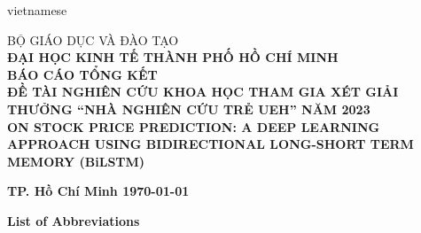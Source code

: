 \documentclass[a4paper]{article}
\begin{document}
\fontsize{13pt}{15pt}\selectfont
\setlength{\parindent}{0cm}
\setlength{\parskip}{1.5ex}
\setlength{\baselineskip}{1.5\baselineskip}
\begin{otherlanguage*}{vietnamese}
\begin{titlepage}

 
\begin{center}

\Large BỘ GIÁO DỤC VÀ ĐÀO TẠO\\[7pt]
\textbf{\Large ĐẠI HỌC KINH TẾ THÀNH PHỐ HỒ CHÍ MINH}\\[3.5cm]
\LARGE\textbf{BÁO CÁO TỔNG KẾT}\\[0.5cm]
\Large\textbf{ĐỀ TÀI NGHIÊN CỨU KHOA HỌC THAM GIA XÉT GIẢI THƯỞNG ``NHÀ NGHIÊN CỨU TRẺ UEH'' NĂM 2023}\\[3cm]

\LARGE\textbf{ON STOCK PRICE PREDICTION: A DEEP LEARNING APPROACH USING BIDIRECTIONAL LONG-SHORT TERM MEMORY (BiLSTM)}
\end{center}
\vspace{1.5cm}

\vfill
\begin{center}
\large \textbf{TP. Hồ Chí Minh {\today}}
\end{center}

\end{titlepage}
\end{otherlanguage*}

\tableofcontents
\pagebreak
\listoffigures
\pagebreak
\listoftables
\pagebreak
\textbf{List of Abbreviations}
\vspace{1cm}
\end{document}
